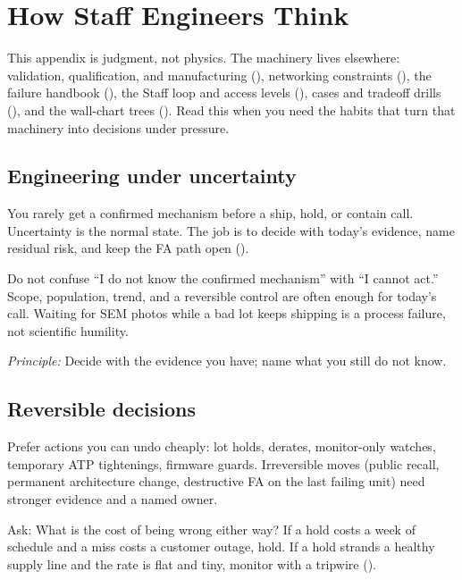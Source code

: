 \chapter{How Staff Engineers Think}
\label{app:staff-thinking}

This appendix is judgment, not physics. The machinery lives elsewhere:
validation, qualification, and manufacturing
(), networking constraints
(), the failure handbook (), the
Staff loop and access levels
(), cases and
tradeoff drills (), and the
wall-chart trees (). Read this when you need the
habits that turn that machinery into decisions under pressure.

\section{Engineering under uncertainty}
\label{sec:staff-uncertainty}

You rarely get a confirmed mechanism before a ship, hold, or contain call.
Uncertainty is the normal state. The job is to decide with today's evidence,
name residual risk, and keep the FA path open
().

Do not confuse ``I do not know the confirmed mechanism'' with ``I cannot act.'' Scope,
population, trend, and a reversible control are often enough for today's call.
Waiting for SEM photos while a bad lot keeps shipping is a process failure, not
scientific humility.

\textit{Principle:} Decide with the evidence you have; name what you still do
not know.

\section{Reversible decisions}
\label{sec:staff-reversible}

Prefer actions you can undo cheaply: lot holds, derates, monitor-only watches,
temporary ATP tightenings, firmware guards. Irreversible moves (public recall,
permanent architecture change, destructive FA on the last failing unit) need
stronger evidence and a named owner.

Ask: What is the cost of being wrong either way? If a hold costs a week of
schedule and a miss costs a customer outage, hold. If a hold strands a healthy
supply line and the rate is flat and tiny, monitor with a tripwire
().

